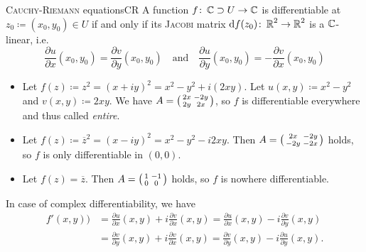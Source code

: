 \documentclass[a4paper,english]{article}
\begin{document}
\begin{thm}{\textsc{Cauchy-Riemann} equations}{CR}
    A function $f \colon \operatorname{\mathbb{C}} \supset U \to \operatorname{\mathbb{C}}$ is differentiable at $z_0 \coloneqq (x_0, y_0) \in U$ if and only if its \textsc{Jacobi} matrix $\mathop{}\!\mathrm{d} f(z_0) \colon \operatorname{\mathbb{R}}^2 \to \operatorname{\mathbb{R}}^2$ is a $\operatorname{\mathbb{C}}$-linear, i.e.
    \begin{equation*}
        \frac{\partial u}{\partial x}(x_0, y_0) 
        = \frac{\partial v}{\partial y}(x_0, y_0) 
        \quad \text{and} \quad \frac{\partial u}{\partial y}(x_0, y_0) 
        = - \frac{\partial v}{\partial x}(x_0, y_0) 
    \end{equation*}
\end{thm}

\begin{exampleB}
    \begin{itemize}
        \item 
        Let $f(z) \coloneqq z^2 = (x + i y)^2 = x^2 - y^2 + i (2 x y)$.
        Let $u(x,y) \coloneqq x^2 - y^2$ and $v(x,y) \coloneqq 2 x y$.
        We have $A = \begin{psmallmatrix} 2 x & - 2 y \\ 2 y & 2 x \end{psmallmatrix}$,
        so $f$ is differentiable everywhere and thus called \emph{entire}.
        
        \item
        Let $f(z) \coloneqq \overline{z}^2 = (x - i y)^2 = x^2 - y^2 - i 2 x y$.
        Then $A = \begin{psmallmatrix} 2 x & - 2 y \\ - 2 y & - 2 x \end{psmallmatrix}$ holds, so $f$ is only differentiable in $(0, 0)$.
        
        \item
        Let $f(z) = \overline{z}$.
        Then $A= \begin{psmallmatrix} 1 & - 1 \\ 0 & 0 \end{psmallmatrix}$ holds, so $f$ is nowhere differentiable.
    \end{itemize}
\end{exampleB}

\begin{remarkB}
    In case of complex differentiability, we have
    \begin{align*}
        f'(x,y))
        & = \frac{\partial u}{\partial x}(x, y) + i \frac{\partial v}{\partial x}(x, y)
        = \frac{\partial u}{\partial x}(x, y) - i \frac{\partial v}{\partial y}(x, y) \\
        & = \frac{\partial v}{\partial y}(x, y) + i \frac{\partial v}{\partial x}(x, y)
        = \frac{\partial v}{\partial y}(x, y) - i \frac{\partial u}{\partial y}(x, y).
    \end{align*}
\end{remarkB}
\end{document}
